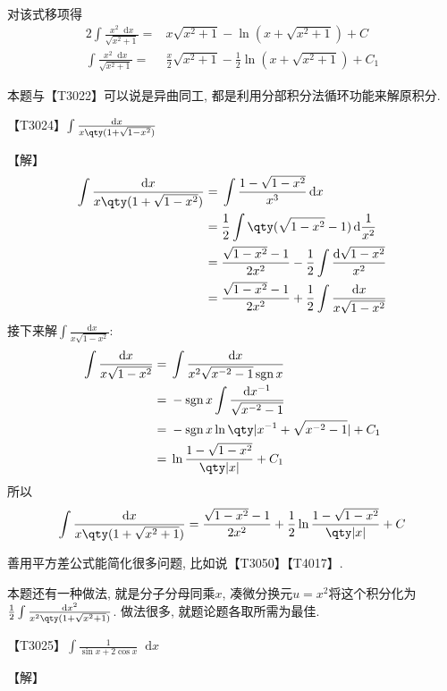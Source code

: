 \documentclass{ctexbook}
\DeclareMathOperator{\sgn}{sgn}
\newcommand*{\dif}{\mathop{}\!\mathrm{d}}
\begin{document}
{\begin{align*}
\end{align*}
对该式移项得
\begin{align*}
2\int\frac{x^{2}\dif{x}}{\sqrt{x^{2}+1}}={}&x\sqrt{x^{2}+1}-\ln(x+\sqrt{x^{2}+1})+C\\
\int\frac{x^{2}\dif{x}}{\sqrt{x^{2}+1}}={}&\frac{x}{2}\sqrt{x^{2}+1}-\frac{1}{2}\ln(x+\sqrt{x^{2}+1})+C_{1}
\end{align*}\par
{\kaishu 本题与{\color{red}【T3022】}可以说是异曲同工, 都是利用分部积分法循环功能来解原积分. \par}
{\color{red}【T3024】}$\int\frac{\dif{x}}{x\qty(1+\sqrt{1-x^{2}})}$\par
【解】
\begin{align*}
\int\frac{\dif{x}}{x\qty(1+\sqrt{1-x^{2}})}={}&\int\frac{1-\sqrt{1-x^{2}}}{x^{3}}\dif{x}\\
={}&\frac{1}{2}\int\qty(\sqrt{1-x^{2}}-1)\dif{\frac{1}{x^{2}}}\\
={}&\frac{\sqrt{1-x^{2}}-1}{2x^{2}}-\frac{1}{2}\int\frac{\dif{\sqrt{1-x^{2}}}}{x^{2}}\\
={}&\frac{\sqrt{1-x^{2}}-1}{2x^{2}}+\frac{1}{2}\int\frac{\dif{x}}{x\sqrt{1-x^{2}}}
\end{align*}
接下来解$\int\frac{\dif{x}}{x\sqrt{1-x^{2}}}$:
\begin{align*}
\int\frac{\dif{x}}{x\sqrt{1-x^{2}}}={}&\int\frac{\dif{x}}{x^{2}\sqrt{x^{-2}-1}\sgn{x}}\\
={}&-\sgn{x}\int\frac{\dif{x^{-1}}}{\sqrt{x^{-2}-1}}\\
={}&-\sgn{x}\ln\qty|x^{-1}+\sqrt{x^{-2}-1}|+C_{1}\\
={}&\ln{\frac{1-\sqrt{1-x^{2}}}{\qty|x|}}+C_{1}
\end{align*}
所以
\begin{align*}
\int\frac{\dif{x}}{x\qty(1+\sqrt{x^{2}+1})}=\frac{\sqrt{1-x^{2}}-1}{2x^{2}}+\frac{1}{2}\ln{\frac{1-\sqrt{1-x^{2}}}{\qty|x|}}+C
\end{align*}\par
{\kaishu 善用平方差公式能简化很多问题, 比如说{\color{red}【T3050】}【T4017】. \par
本题还有一种做法, 就是分子分母同乘$x$, 凑微分换元$u=x^{2}$将这个积分化为\\$\frac{1}{2}\int\frac{\dif{x^{2}}}{x^{2}\qty(1+\sqrt{x^{2}+1})}$. 做法很多, 就题论题各取所需为最佳. \par}
{\color{red}【T3025】}$\int\frac{1}{\sin{x}+2\cos{x}}\dif{x}$\par
【解】
\begin{align*}

\end{align*}}
\end{document}
